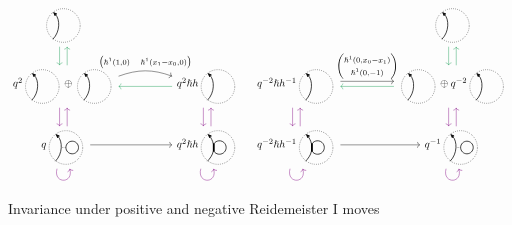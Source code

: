 \documentclass{article}
\theoremstyle{plain} %
\theoremstyle{definition} %
\theoremstyle{remark} %
\begin{document}
\begin{figure}
    \centering
\[\label{r1}
\begin{tikzcd}[column sep=1.8cm, ampersand replacement=\&]
\scalebox{0.7}{\SingleEdge{}{}}  
\arrow[d, color=ForestGreen, shift right=1.5] 
\& \\
q^2\scalebox{0.7}{\SingleEdge{}{}}\oplus \scalebox{0.7}{\SingleEdge{}{}}  
\arrow[u, color=ForestGreen, shift right=1.5] 
\arrow[d, color=violet, shift right=1.5] 
\arrow[r, "{\begin{pmatrix}\hslash^1(1,0) & \hslash^1(x_1-x_0,0) \end{pmatrix}}", shift left=3, bend left=20, start anchor=east, end anchor=west]
\&
q^2\hslash h\scalebox{0.7}{\SingleEdge{}{}} 
\arrow[d, color=violet, shift right=1.5]
\arrow[l, color=ForestGreen, shift left=1]
\\
q\scalebox{0.7}{\ThinEdgeAndCircle{}{}{}} \arrow[r]
\arrow[u, color=violet, shift right=1.5] 
\arrow[loop right, distance=1.5em, in=-75, out=-105, color=violet]
\&
q^2\hslash h\scalebox{0.7}{\ThickEdgeAndCircle{}{}{}} 
\arrow[u, color=violet, shift right=1.5] 
\arrow[loop right, distance=1.5em, in=-75, out=-105, color=violet] 
\end{tikzcd} 
\quad
\begin{tikzcd}[column sep=1.8cm]
 & 
 \scalebox{0.7}{\SingleEdge{}{}}  
 \arrow[d, color=ForestGreen, shift right=1.5] 
 \\
q^{-2}\hslash h^{-1}\scalebox{0.7}{\SingleEdge{}{}}   \arrow[d, color=violet, shift right=1.5] 
\ar[r, "{\begin{pmatrix}\hslash^1(0,x_0-x_1) \\\hslash^1(0,-1)
\end{pmatrix}}", shift left=1] 
&
\scalebox{0.7}{\SingleEdge{}{}}\oplus q^{-2}\scalebox{0.7}{\SingleEdge{}{}} 
\arrow[d, color=violet, shift right=1.5]
\arrow[u, color=ForestGreen, shift right=1.5] 
\ar[l, color=ForestGreen, shift left=1] 
\\
q^{-2}\hslash h^{-1}\scalebox{0.7}{\ThickEdgeAndCircle{}{}{}} 
\ar[r] 
\arrow[u, color=violet, shift right=1.5] 
\arrow[loop right, distance=1.5em, in=-75, out=-105, color=violet] 
&
q^{-1}\scalebox{0.7}{\ThinEdgeAndCircle{}{}{}} 
\arrow[u, color=violet, shift right=1.5] 
\arrow[loop right, distance=1.5em, in=-75, out=-105, color=violet]
\end{tikzcd}
\]
    \caption{Invariance under positive and negative Reidemeister I moves}
    \label{fig:R1}
\end{figure}
\end{document}
